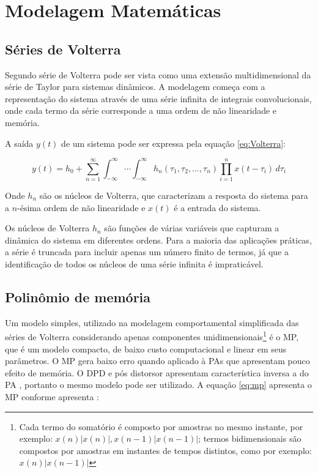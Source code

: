 \section{Modelagem Matemáticas}

\subsection*{Séries de Volterra}
Segundo \cite{Gonçalves2009} série de Volterra pode ser vista como uma extensão multidimensional da série de Taylor para sistemas dinâmicos. A modelagem começa com a representação do sistema através de uma série infinita de integrais convolucionais, onde cada termo da série corresponde a uma ordem de não linearidade e memória.

A saída \( y(t) \) de um sistema pode ser expressa pela equação \ref{eq:Volterra}:

\begin{equation}
    y(t) = h_0 + \sum_{n=1}^{\infty} \int_{-\infty}^{\infty} \cdots \int_{-\infty}^{\infty} h_n(\tau_1, \tau_2, \ldots, \tau_n) \prod_{i=1}^{n} x(t - \tau_i) \, d\tau_i
    \label{eq:Volterra}
\end{equation}

Onde \( h_n \) são os núcleos de Volterra, que caracterizam a resposta do sistema para a \( n \)-ésima ordem de não linearidade e \( x(t) \) é a entrada do sistema.

Os núcleos de Volterra \( h_n \) são funções de várias variáveis que capturam a dinâmica do sistema em diferentes ordens. Para a maioria das aplicações práticas, a série é truncada para incluir apenas um número finito de termos, já que a identificação de todos os núcleos de uma série infinita é impraticável.

\subsection*{Polinômio de memória}\label{sub:polimem}

Um modelo simples, utilizado na modelagem comportamental simpliﬁcada das séries de Volterra considerando apenas componentes unidimensionais\footnote{Cada termo do somatório é composto por amostras no mesmo instante, por exemplo: $x(n)|x(n)|,x(n - 1)|x(n - 1)|$; termos bidimensionais são compostos por amostras em instantes de tempos distintos, como por exemplo: $x(n)|x(n - 1)|$} é o MP, que é um modelo compacto, de baixo custo computacional e linear em seus parâmetros. O MP gera baixo erro quando aplicado à PAs que apresentam pouco efeito de memória. O DPD e pós distorsor apresentam característica inversa a do PA \cite{Schuartz2017}, portanto o mesmo modelo pode ser utilizado. A equação \ref{eq:mp} apresenta o MP conforme apresenta \cite{Schuartz2017}: 

